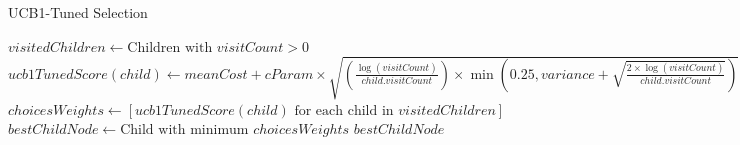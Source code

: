 \begin{algorithm}[H]
    \caption{UCB1-Tuned Selection}
    \label{alg:UCB1_tuned}
    \begin{algorithmic}[1]
        \STATE $visitedChildren \leftarrow \text{Children with } visitCount > 0$
        \STATE $ucb1TunedScore(child) \leftarrow meanCost + cParam \times \sqrt{\left(\frac{\log(visitCount)}{child.visitCount}\right) \times \min\left(0.25, variance + \sqrt{\frac{2 \times \log(visitCount)}{child.visitCount}}\right)}$
        \STATE $choicesWeights \leftarrow \left[ ucb1TunedScore(child) \text{ for each child in } visitedChildren \right]$
        \STATE $bestChildNode \leftarrow \text{Child with minimum } choicesWeights$
        \RETURN $bestChildNode$
    \end{algorithmic}
\end{algorithm}